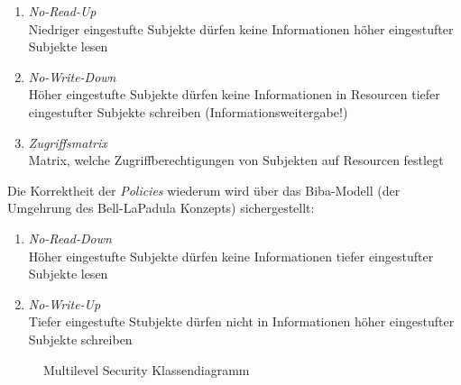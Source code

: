 \begin{enumerate}
	\item \emph{No-Read-Up}\\
	Niedriger eingestufte Subjekte dürfen keine Informationen höher eingestufter Subjekte lesen
	\item \emph{No-Write-Down}\\
	Höher eingestufte Subjekte dürfen keine Informationen in Resourcen tiefer eingestufter Subjekte schreiben (Informationsweitergabe!)
	\item \emph{Zugriffsmatrix}\\
	Matrix, welche Zugriffberechtigungen von Subjekten auf Resourcen festlegt
\end{enumerate}


Die Korrektheit der \emph{Policies} wiederum wird über das Biba-Modell\cite{Biba} (der Umgehrung des Bell-LaPadula Konzepts) sichergestellt:

\begin{enumerate}
	\item \emph{No-Read-Down}\\
	Höher eingestufte Subjekte dürfen keine Informationen tiefer eingestufter Subjekte lesen
	\item \emph{No-Write-Up}\\
	Tiefer eingestufte Stubjekte dürfen nicht in Informationen höher eingestufter Subjekte schreiben
\end{enumerate}


\begin{figure}[H]
	\begin{center}
	\end{center}
\caption{Multilevel Security Klassendiagramm}
\end{figure}

